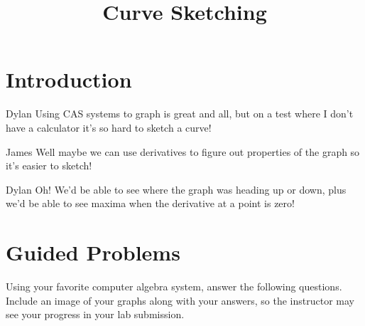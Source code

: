 \documentclass{ximera}
\title{Curve Sketching}
\begin{document}
\maketitle
\section{Introduction}
\begin{dialogue}
\item[Dylan] Using CAS systems to graph is great and all, but on a test where I don't have a calculator it's so hard to sketch a curve!
\item[James] Well maybe we can use derivatives to figure out properties of the graph so it's easier to sketch!
\item[Dylan] Oh! We'd be able to see where the graph was heading up or down, plus we'd be able to see maxima when the derivative at a point is zero!
\end{dialogue}

\section{Guided Problems}
Using your favorite computer algebra system, answer the following questions. Include an image of your graphs along with your answers, so the instructor may see your progress in your lab submission. 
\end{document}

